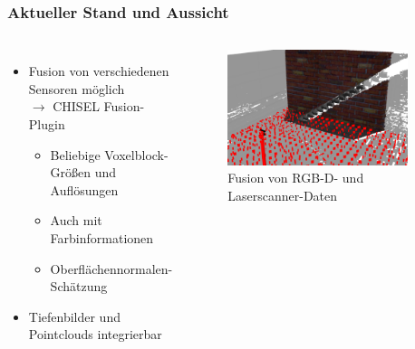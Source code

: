     \begin{frame}[t]
    \frametitle{Aktueller Stand und Aussicht}
      
      \begin{columns}[t]
      \column{5cm}
     \begin{itemize}
     \item Fusion von verschiedenen Sensoren möglich \\ $\rightarrow$ CHISEL Fusion-Plugin
      \begin{itemize}
	\item  Beliebige Voxelblock-Größen und Auflösungen
	\item  Auch mit Farbinformationen
	\item  Oberflächennormalen-Schätzung 
      \end{itemize}
     \item Tiefenbilder und Pointclouds integrierbar

      \end{itemize}
     
     \column{7cm}
      
       \begin{figure}[h]
 	\centering
 	    \includegraphics[width=0.9\textwidth]{images/mason_trim}
 	\caption{Fusion von RGB-D- und Laserscanner-Daten} 
       \end{figure}
  
    \end{columns}
     
    \end{frame}

